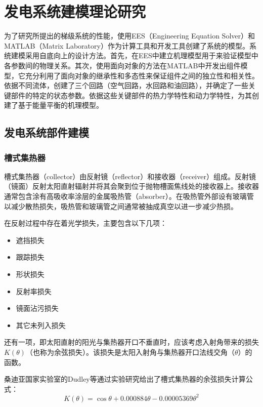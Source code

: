 \chapter{发电系统建模理论研究}
\label{cha:Modeling}

为了研究所提出的梯级系统的性能，使用EES（Engineering Equation Solver）和MATLAB（Matrix Laboratory）作为计算工具和开发工具创建了系统的模型。系统建模采用自底向上的设计方法。首先，在EES中建立机理模型用于来验证模型中各参数间的物理关系。其次，使用面向对象的方法在MATLAB中开发出组件模型，它充分利用了面向对象的继承性和多态性来保证组件之间的独立性和相关性。
依据不同流体，创建了三个回路（空气回路，水回路和油回路），并确定了一些关键部件的特定的状态参数。依据这些关键部件的热力学特性和动力学特性，为其创建了基于能量平衡的机理模型。

\section{发电系统部件建模}
\subsection{槽式集热器}
\label{sec:ptc}

槽式集热器（collector）由反射镜（reflector）和接收器（receiver）组成。反射镜（镜面）反射太阳直射辐射并将其会聚到位于抛物槽面焦线处的接收器上。接收器通常包含涂有高吸收率涂层的金属吸热管（absorber）。在吸热管外部设有玻璃管以减少散热损失，吸热管和玻璃管之间通常被抽成真空以进一步减少热损。

在反射过程中存在着光学损失，主要包含以下几项\cite{Price2002}：

\begin{itemize}
  \item 遮挡损失
  \item 跟踪损失
  \item 形状损失
  \item 反射率损失
  \item 镜面沾污损失
  \item 其它未列入损失
\end{itemize}

还有一项，即太阳直射的阳光与集热器开口不垂直时，应该考虑入射角带来的损失$K(\theta)$（也称为余弦损失）。该损失是太阳入射角与集热器开口法线交角（$\theta$）的函数。

桑迪亚国家实验室的Dudley等\cite{Dudley1994}通过实验研究给出了槽式集热器的余弦损失计算公式：
\begin{equation}
  K(\theta) = \cos\theta+0.000884\theta-0.00005369\theta^2
\end{equation}

